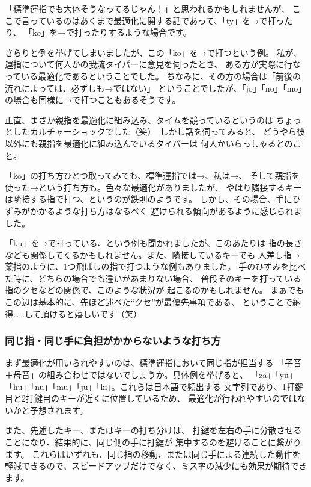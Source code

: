 「標準運指でも大体そうなってるじゃん！」と思われるかもしれませんが、
ここで言っているのはあくまで最適化に関する話であって、「ty」を→で打ったり、
「ko」を→で打ったりするような場合です。

さらりと例を挙げてしまいましたが、この「ko」を→で打つという例。
私が、運指について何人かの我流タイパーに意見を伺ったとき、
ある方が実際に行なっている最適化であるということでした。
ちなみに、その方の場合は「前後の流れによっては、必ずしも→ではない」
ということでしたが、「jo」「no」「mo」の場合も同様に→で打つこともあるそうです。

正直、まさか親指を最適化に組み込み、タイムを競っているというのは
ちょっとしたカルチャーショックでした（笑）　しかし話を伺ってみると、
どうやら彼以外にも親指を最適化に組み込んでいるタイパーは
何人かいらっしゃるとのこと。


「ko」の打ち方ひとつ取ってみても、標準運指では→、私は→、
そして親指を使った→という打ち方も。色々な最適化がありましたが、
やはり隣接するキーは隣接する指で打つ、というのが鉄則のようです。
しかし、その場合、手にひずみがかかるような打ち方はなるべく
避けられる傾向があるように感じられました。


「ku」を→で打っている、という例も聞かれましたが、このあたりは
指の長さなども関係してくるかもしれません。また、隣接しているキーでも
人差し指→薬指のように、1つ飛ばしの指で打つような例もありました。
手のひずみを比べた時に、どちらの場合でも違いがあまりない場合、
普段そのキーを打っている指のクセなどの関係で、このような状況が
起こるのかもしれません。
まぁでもこの辺は基本的に、先ほど述べた“クセ”が最優先事項である、
ということで納得……して頂けると嬉しいです（笑）


\subsubsection*{同じ指・同じ手に負担がかからないような打ち方}

まず最適化が用いられやすいのは、標準運指において同じ指が担当する
「子音＋母音」の組み合わせではないでしょうか。具体例を挙げると、
「za」「yu」「hu」「nu」「mu」「ju」「ki」。これらは日本語で頻出する
文字列であり、1打鍵目と2打鍵目のキーが近くに位置しているため、
最適化が行われやすいのではないかと予想されます。

また、先述したキー、またはキーの打ち分けは、
打鍵を左右の手に分散させることになり、結果的に、同じ側の手に打鍵が
集中するのを避けることに繋がります。
これらはいずれも、同じ指の移動、または同じ手による連続した動作を
軽減できるので、スピードアップだけでなく、ミス率の減少にも効果が期待できます。



